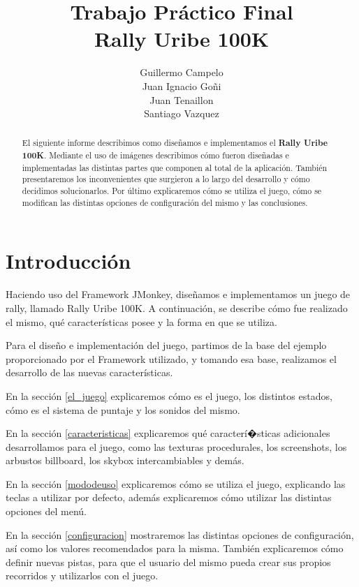 \documentclass[a4paper,10pt]{article}
\title{Trabajo Pr\'actico Final\\Rally Uribe 100K\\}
\author{Guillermo Campelo\\Juan Ignacio Go\~ni\\Juan
Tenaillon\\Santiago Vazquez}
\begin{document}
\maketitle


\begin{abstract}
El siguiente informe describimos como dise\~namos e implementamos el
\textbf{Rally
Uribe
100K}. 
Mediante el uso de im\'agenes describimos c\'omo fueron dise\~nadas e
implementadas
las distintas partes que componen al total de la aplicaci\'on.  Tambi\'en
presentaremos los inconvenientes que surgieron a lo largo del desarrollo y
c\'omo decidimos solucionarlos.  Por \'ultimo explicaremos c\'omo se utiliza
el
juego,
c\'omo se modifican las distintas opciones de configuraci\'on del mismo y las
conclusiones.
\end{abstract}

\pagebreak
\tableofcontents
\pagebreak

\section{Introducci\'on}

Haciendo uso del Framework JMonkey, dise\~namos e implementamos un juego de
rally,
llamado Rally Uribe 100K.  A continuaci\'on, se describe c\'omo fue realizado el
mismo, qu\'e caracter\'isticas posee y la forma en que se utiliza.

Para el dise\~no e implementaci\'on del juego, partimos de la base del ejemplo
proporcionado por el Framework utilizado, y tomando esa base, realizamos
el desarrollo de las nuevas caracter\'isticas.

En la secci\'on \ref{el_juego} explicaremos c\'omo es el juego, los distintos
estados, c\'omo es el sistema de puntaje y los sonidos del mismo.

En la secci\'on \ref{caracteristicas} explicaremos qu\'e caracter\'i�sticas
adicionales desarrollamos para el juego, como las texturas procedurales,
los screenshots, los arbustos billboard, los skybox intercambiables y dem\'as.

En la secci\'on \ref{mododeuso} explicaremos c\'omo se utiliza el juego,
explicando
las teclas a utilizar por defecto, adem\'as explicaremos c\'omo utilizar las
distintas opciones del men\'u.

En la secci\'on \ref{configuracion} mostraremos las distintas opciones de
configuraci\'on, as\'i como los valores recomendados para la misma.  Tambi\'en
explicaremos c\'omo definir nuevas pistas, para que el usuario del mismo pueda
crear
sus propios recorridos y utilizarlos con el juego.
\end{document}
